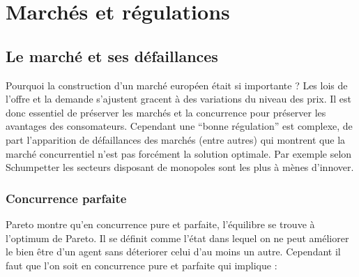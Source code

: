 \section{Marchés et régulations} %
\label{prt:marches_et_regulations}

\subsection{Le marché et ses défaillances} %
\label{sec:le_marche_et_ses_defaillances}

Pourquoi la construction d'un marché européen était si importante ? Les lois de l'offre et la demande s'ajustent gracent à des variations du niveau des prix. Il est donc essentiel de préserver les marchés et la concurrence pour préserver les avantages des consomateurs. Cependant une ``bonne régulation'' est complexe, de part l'apparition de défaillances des marchés (entre autres) qui montrent que la marché concurrentiel n'est pas forcément la solution optimale. Par exemple selon Schumpetter les secteurs disposant de monopoles sont les plus à mènes d'innover.

\subsubsection{Concurrence parfaite} %
\label{sub:concurrence_parfaite}

Pareto montre qu'en concurrence pure et parfaite, l'équilibre se trouve à l'optimum de Pareto. Il se définit comme l'état dans lequel on ne peut améliorer le bien être d'un agent sans déteriorer celui d'au moins un autre. Cependant il faut que l'on soit en concurrence pure et parfaite qui implique : 


